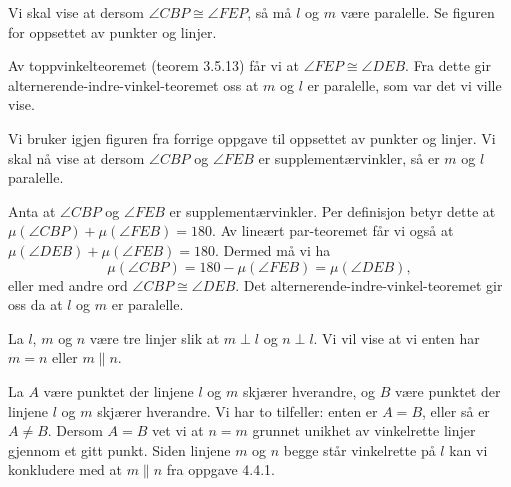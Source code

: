
\begin{oppgave}[4.4.1]
    Vi skal vise at dersom $\angle CBP\cong \angle FEP$, så må $l$ og $m$ være paralelle. 
    Se figuren for oppsettet av punkter og linjer. 

    Av toppvinkelteoremet (teorem 3.5.13) får vi at $\angle FEP\cong \angle DEB$. 
    Fra dette gir alternerende-indre-vinkel-teoremet oss at $m$ og $l$ er paralelle, som var det vi ville vise. 

    \begin{figure}[H]
        \centering
        
    \end{figure}
\end{oppgave}

\begin{oppgave}[4.4.2]
    Vi bruker igjen figuren fra forrige oppgave til oppsettet av punkter og linjer. 
    Vi skal nå vise at dersom $\angle CBP$ og $\angle FEB$ er supplementærvinkler, så er $m$ og $l$ paralelle. 

    Anta at $\angle CBP$ og $\angle FEB$ er supplementærvinkler. 
    Per definisjon betyr dette at $\mu(\angle CBP)+\mu(\angle FEB) = 180$. 
    Av lineært par-teoremet får vi også at $\mu(\angle DEB)+\mu(\angle FEB)=180$. 
    Dermed må vi ha 
    $$\mu(\angle CBP) = 180 - \mu(\angle FEB) = \mu(\angle DEB),$$
    eller med andre ord $\angle CBP\cong \angle DEB$.
    Det alternerende-indre-vinkel-teoremet gir oss da at $l$ og $m$ er paralelle. 
\end{oppgave}

\begin{oppgave}[4.4.3]
    La $l$, $m$ og $n$ være tre linjer slik at $m\perp l$ og $n\perp l$. 
    Vi vil vise at vi enten har $m=n$ eller $m \parallel n$. 

    La $A$ være punktet der linjene $l$ og $m$ skjærer hverandre, og $B$ være punktet der linjene $l$ og $m$ skjærer hverandre.
    Vi har to tilfeller: enten er $A=B$, eller så er $A\neq B$. 
    Dersom $A=B$ vet vi at $n=m$ grunnet unikhet av vinkelrette linjer gjennom et gitt punkt. 
    Siden linjene $m$ og $n$ begge står vinkelrette på $l$ kan vi konkludere med at $m\parallel n$ fra oppgave 4.4.1.  

    \begin{figure}[H]
        \centering
        
    \end{figure}
\end{oppgave}

